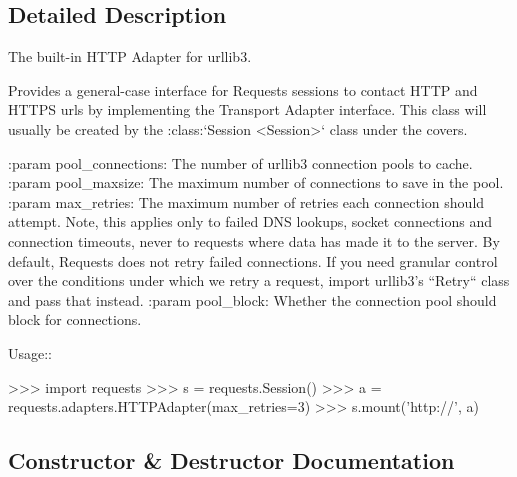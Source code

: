 \subsection{Detailed Description}
\begin{DoxyVerb}The built-in HTTP Adapter for urllib3.

Provides a general-case interface for Requests sessions to contact HTTP and
HTTPS urls by implementing the Transport Adapter interface. This class will
usually be created by the :class:`Session <Session>` class under the
covers.

:param pool_connections: The number of urllib3 connection pools to cache.
:param pool_maxsize: The maximum number of connections to save in the pool.
:param max_retries: The maximum number of retries each connection
    should attempt. Note, this applies only to failed DNS lookups, socket
    connections and connection timeouts, never to requests where data has
    made it to the server. By default, Requests does not retry failed
    connections. If you need granular control over the conditions under
    which we retry a request, import urllib3's ``Retry`` class and pass
    that instead.
:param pool_block: Whether the connection pool should block for connections.

Usage::

  >>> import requests
  >>> s = requests.Session()
  >>> a = requests.adapters.HTTPAdapter(max_retries=3)
  >>> s.mount('http://', a)
\end{DoxyVerb}
 

\subsection{Constructor \& Destructor Documentation}
\mbox{\label{classpip_1_1__vendor_1_1requests_1_1adapters_1_1HTTPAdapter_a2ab7626cd27702e1018c9659d81478da}} 

